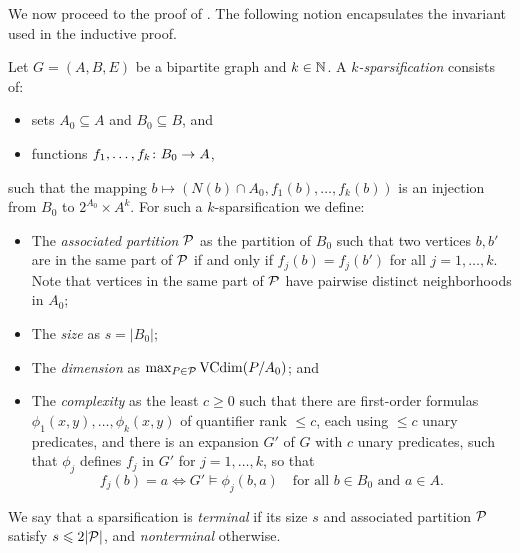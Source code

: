 We now proceed to the proof of .
The following notion encapsulates the invariant used in the inductive proof.
\begin{definition}
  Let $G=(A,B,E)$ be a bipartite graph and $k\in\N$.
  A \emph{$k$-sparsification} consists of:
  \begin{itemize}
    \item sets $A_0\subseteq A$ and $B_0\subseteq B$, and
    \item functions $f_1,\ldots,f_k\from B_0\to A$,
  \end{itemize}
  such that
  the mapping $b\mapsto (N(b)\cap A_0,f_1(b),\ldots,f_k(b))$ is an injection from $B_0$ to $2^{A_0} \times A^k$.
For such a $k$-sparsification we define:
\begin{itemize}
  \item The \emph{associated partition} $\cal P$ as the partition of $B_0$ such that two vertices $b,b'$ are in the same part of $\cal P$ if and only if 
  $f_j(b)=f_j(b')$ for all $j=1,\ldots,k$. Note that vertices in the same part of $\cal P$ have pairwise distinct neighborhoods in $A_0$;
  \item The \emph{size} as $s=|B_0|$;
  \item The \emph{dimension} as $\max_{P\in\cal P} \VCdim(\inducedSS{P}{A_0})$; and
  \item The \emph{complexity} as the least $c\ge0$ such that there are first-order formulas $\phi_1(x,y),\ldots,\phi_k(x,y)$ of quantifier rank ${\le}c$, each using ${\le}c$ unary predicates, and there is an expansion $G'$ of $G$ with $c$ unary predicates,
  such that $\phi_j$ defines $f_j$ in $G'$ for $j=1,\ldots,k$, so that 
  \[
    f_j(b)=a\iff G'\models \phi_j(b,a)
    \quad
    \text{for all $b\in B_0$ and $a\in A$.}  
  \]
\end{itemize}
We say that a sparsification is \emph{terminal} if its size $s$ and
associated partition $\cal P$ satisfy $s\le 2|\cal P|$, and
\emph{nonterminal} otherwise.
\end{definition}


